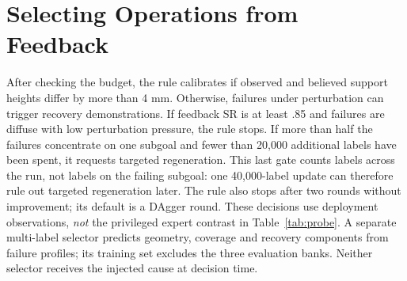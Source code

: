\clearpage
\section{Selecting Operations from Feedback}
After checking the budget, the rule calibrates if observed and believed support heights differ by more than 4 mm. Otherwise, failures under perturbation can trigger recovery demonstrations. If feedback SR is at least .85 and failures are diffuse with low perturbation pressure, the rule stops. If more than half the failures concentrate on one subgoal and fewer than 20,000 additional labels have been spent, it requests targeted regeneration. This last gate counts labels across the run, not labels on the failing subgoal: one 40,000-label update can therefore rule out targeted regeneration later. The rule also stops after two rounds without improvement; its default is a DAgger round. These decisions use deployment observations, \emph{not} the privileged expert contrast in Table~\ref{tab:probe}. A separate multi-label selector predicts geometry, coverage and recovery components from failure profiles; its training set excludes the three evaluation banks. Neither selector receives the injected cause at decision time.

